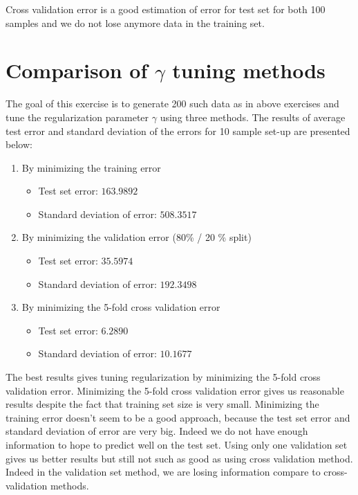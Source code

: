 \documentclass{article} %
\begin{document}
\newpage
Cross validation error is a good estimation of error for test set for both 100 samples and we do not lose anymore data in the training set. 



\section{Comparison of  $\gamma$ tuning methods}
The goal of this exercise is to generate 200 such data as in above exercises and tune the regularization parameter $\gamma$ using three methods. The results of average test error and standard deviation of the errors for 10 sample set-up are presented below:

\begin{enumerate}
\item By minimizing the training error
\begin{itemize}
\item Test set error: $163.9892$
\item Standard deviation of error: $508.3517$
\end{itemize}
\item By minimizing the validation error (80\% / 20 \% split)
\begin{itemize}
\item Test set error: $35.5974$
\item Standard deviation of error: $192.3498$
\end{itemize}
\item By minimizing the 5-fold cross validation error
\begin{itemize}
\item Test set error: $6.2890$
\item Standard deviation of error: $10.1677$
\end{itemize}
\end{enumerate}

The best results gives tuning regularization by minimizing the 5-fold cross validation error. Minimizing the 5-fold cross validation error gives us reasonable results despite the fact that training set size is very small. Minimizing the training error doesn't seem to be a good approach, because the test set error and  standard deviation of error are very big. Indeed we do not have enough information to hope to predict well on the test set. Using only one validation set gives us better results but still not such as good as using cross validation method. Indeed in the validation set method, we are losing information compare to cross-validation methods.
\end{document}
